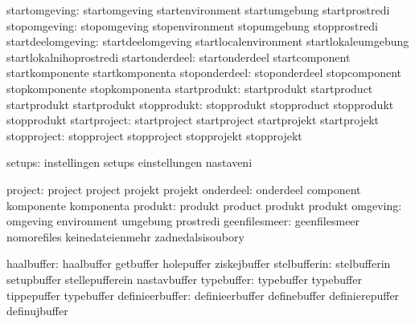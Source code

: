                 startomgeving:  startomgeving                startenvironment
                                startumgebung                startprostredi
                 stopomgeving:  stopomgeving                 stopenvironment
                                stopumgebung                 stopprostredi
            startdeelomgeving:  startdeelomgeving            startlocalenvironment
                                startlokaleumgebung          startlokalnihoprostredi
               startonderdeel:  startonderdeel               startcomponent
                                startkomponente              startkomponenta
                stoponderdeel:  stoponderdeel                stopcomponent
                                stopkomponente               stopkomponenta
                 startprodukt:  startprodukt                 startproduct
                                startprodukt                 startprodukt
                  stopprodukt:  stopprodukt                  stopproduct
                                stopprodukt                  stopprodukt
                 startproject:  startproject                 startproject
                                startprojekt                 startprojekt
                  stopproject:  stopproject                  stopproject
                                stopprojekt                  stopprojekt

                       setups:  instellingen                 setups
                                einstellungen                nastaveni

                      project:  project                      project
                                projekt                      projekt
                    onderdeel:  onderdeel                    component
                                komponente                   komponenta
                      produkt:  produkt                      product
                                produkt                      produkt
                     omgeving:  omgeving                     environment
                                umgebung                     prostredi
                geenfilesmeer:  geenfilesmeer                nomorefiles
                                keinedateienmehr             zadnedalsisoubory

                   haalbuffer:  haalbuffer                   getbuffer
                                holepuffer                   ziskejbuffer
                 stelbufferin:  stelbufferin                 setupbuffer
                                stellepufferein              nastavbuffer
                   typebuffer:  typebuffer                   typebuffer
                                tippepuffer                  typebuffer
              definieerbuffer:  definieerbuffer              definebuffer
                                definierepuffer              definujbuffer

